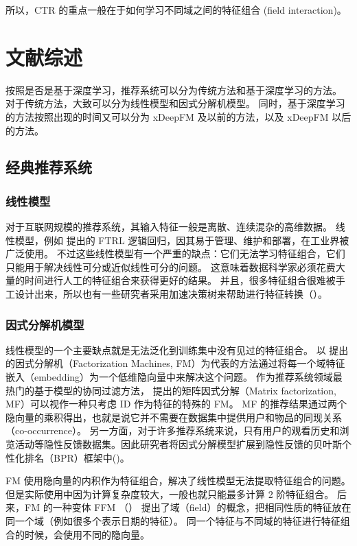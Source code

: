\documentclass[degree=master,cjk-font=noto]{thuthesis}
\begin{document}
所以，CTR 的重点一般在于如何学习不同域之间的特征组合 (field interaction)。

\chapter{文献综述}

按照是否是基于深度学习，推荐系统可以分为传统方法和基于深度学习的方法。
对于传统方法，大致可以分为线性模型和因式分解机模型。
同时，基于深度学习的方法按照出现的时间又可以分为 xDeepFM 及以前的方法，以及 xDeepFM 以后的方法。

\section{经典推荐系统}

\subsection{线性模型}

对于互联网规模的推荐系统，其输入特征一般是离散、连续混杂的高维数据。
线性模型，例如 \cite{tfrl} 提出的 FTRL 逻辑回归，因其易于管理、维护和部署，在工业界被广泛使用。
不过这些线性模型有一个严重的缺点：它们无法学习特征组合，它们只能用于解决线性可分或近似线性可分的问题。
这意味着数据科学家必须花费大量的时间进行人工的特征组合来获得更好的结果。
并且，很多特征组合很难被手工设计出来，所以也有一些研究者采用加速决策树来帮助进行特征转换（\cite{ctr_bing}）。

\subsection{因式分解机模型}

线性模型的一个主要缺点就是无法泛化到训练集中没有见过的特征组合。
以 \cite{fm} 提出的因式分解机（Factorization Machines, FM）为代表的方法通过将每一个域特征嵌入（embedding）为一个低维隐向量中来解决这个问题。
作为推荐系统领域最热门的基于模型的协同过滤方法，\cite{mf} 提出的矩阵因式分解（Matrix factorization, MF）可以视作一种只考虑 ID 作为特征的特殊的 FM。
MF 的推荐结果通过两个隐向量的乘积得出，也就是说它并不需要在数据集中提供用户和物品的同现关系（co-occurrence）。
另一方面，对于许多推荐系统来说，只有用户的观看历史和浏览活动等隐性反馈数据集。因此研究者将因式分解模型扩展到隐性反馈的贝叶斯个性化排名（BPR）框架中(\cite{vbpr})。

FM 使用隐向量的内积作为特征组合，解决了线性模型无法提取特征组合的问题。
但是实际使用中因为计算复杂度较大，一般也就只能最多计算 2 阶特征组合。
后来，FM 的一种变体 FFM （\cite{ffm}） 提出了域（field）的概念，把相同性质的特征放在同一个域（例如很多个表示日期的特征）。
同一个特征与不同域的特征进行特征组合的时候，会使用不同的隐向量。
\end{document}
